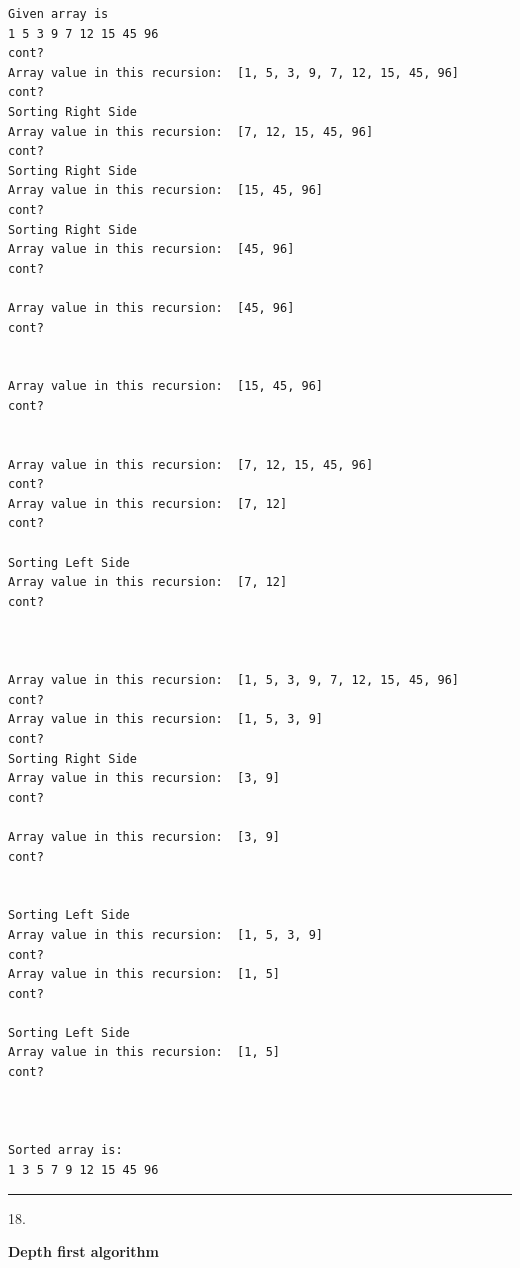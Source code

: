 \documentclass{article}
\begin{document}
\begin{lstlisting}
Given array is
1 5 3 9 7 12 15 45 96 
cont?
Array value in this recursion:  [1, 5, 3, 9, 7, 12, 15, 45, 96]
cont?
Sorting Right Side
Array value in this recursion:  [7, 12, 15, 45, 96]
cont?
Sorting Right Side
Array value in this recursion:  [15, 45, 96]
cont?
Sorting Right Side
Array value in this recursion:  [45, 96]
cont?

Array value in this recursion:  [45, 96]
cont?


Array value in this recursion:  [15, 45, 96]
cont?


Array value in this recursion:  [7, 12, 15, 45, 96]
cont?
Array value in this recursion:  [7, 12]
cont?

Sorting Left Side
Array value in this recursion:  [7, 12]
cont?



Array value in this recursion:  [1, 5, 3, 9, 7, 12, 15, 45, 96]
cont?
Array value in this recursion:  [1, 5, 3, 9]
cont?
Sorting Right Side
Array value in this recursion:  [3, 9]
cont?

Array value in this recursion:  [3, 9]
cont?


Sorting Left Side
Array value in this recursion:  [1, 5, 3, 9]
cont?
Array value in this recursion:  [1, 5]
cont?

Sorting Left Side
Array value in this recursion:  [1, 5]
cont?



Sorted array is: 
1 3 5 7 9 12 15 45 96 
\end{lstlisting}



\noindent\rule{8cm}{0.4pt}


18. 

\textbf{Depth first algorithm}
\end{document}
